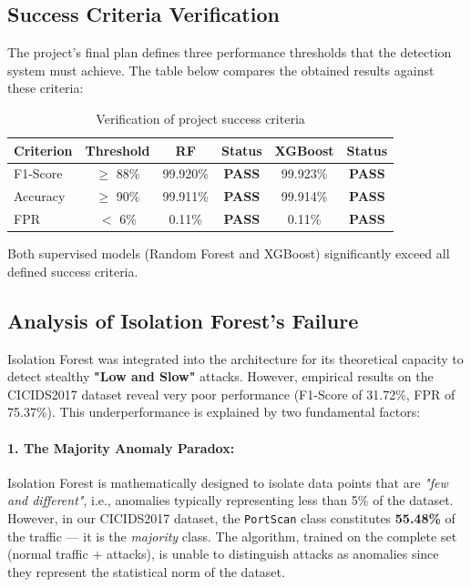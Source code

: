 \subsection{Success Criteria Verification}

The project's final plan defines three performance thresholds that the detection system must achieve. The table below compares the obtained results against these criteria:

\begin{table}[H]
\centering
\caption{Verification of project success criteria}
\label{tab:success}
\begin{tabular}{lccccc}
\toprule
\textbf{Criterion} & \textbf{Threshold} & \textbf{RF} & \textbf{Status} & \textbf{XGBoost} & \textbf{Status} \\
\midrule
F1-Score & $\geq$ 88\% & 99.920\% & \textbf{PASS} & 99.923\% & \textbf{PASS} \\
Accuracy & $\geq$ 90\% & 99.911\% & \textbf{PASS} & 99.914\% & \textbf{PASS} \\
FPR & $<$ 6\% & 0.11\% & \textbf{PASS} & 0.11\% & \textbf{PASS} \\
\bottomrule
\end{tabular}
\end{table}

\noindent Both supervised models (Random Forest and XGBoost) significantly exceed all defined success criteria.

\subsection{Analysis of Isolation Forest's Failure}

Isolation Forest was integrated into the architecture for its theoretical capacity to detect stealthy \textbf{"Low and Slow"} attacks. However, empirical results on the CICIDS2017 dataset reveal very poor performance (F1-Score of 31.72\%, FPR of 75.37\%). This underperformance is explained by two fundamental factors:

\paragraph{1. The Majority Anomaly Paradox:} Isolation Forest is mathematically designed to isolate data points that are \textit{"few and different"}, i.e., anomalies typically representing less than 5\% of the dataset. However, in our CICIDS2017 dataset, the \texttt{PortScan} class constitutes \textbf{55.48\%} of the traffic --- it is the \textit{majority} class. The algorithm, trained on the complete set (normal traffic + attacks), is unable to distinguish attacks as anomalies since they represent the statistical norm of the dataset.


